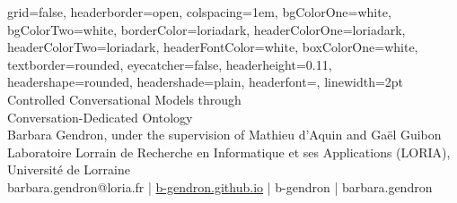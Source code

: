 \documentclass[a0paper,portrait]{baposter}
\begin{document}

\begin{poster}
{
grid=false,
headerborder=open, %
colspacing=1em, %
bgColorOne=white, %
bgColorTwo=white, %
borderColor=loriadark, %
headerColorOne=loriadark, %
headerColorTwo=loriadark, %
headerFontColor=white, %
boxColorOne=white, %
textborder=rounded, %
eyecatcher=false, %
headerheight=0.11\textheight, %
headershape=rounded, %
headershade=plain,
headerfont=\Large\textsf, %
linewidth=2pt %
}
{}
%
%
{\textsf{Controlled Conversational Models through \\ Conversation-Dedicated Ontology}}
{\sf\vspace{0.3em}\\
Barbara Gendron, under the supervision of Mathieu d'Aquin and Gaël Guibon
\vspace{0.1em}\\
\small{Laboratoire Lorrain de Recherche en Informatique et ses Applications (LORIA), Université de Lorraine
\vspace{0.2em}\\
\faEnvelopeO \enspace barbara.gendron@loria.fr | \faDesktop \enspace \url{b-gendron.github.io} | \faGithub \enspace b-gendron | \faLinkedin \enspace barbara.gendron
}}
{
}%


\end{poster}
\end{document}
